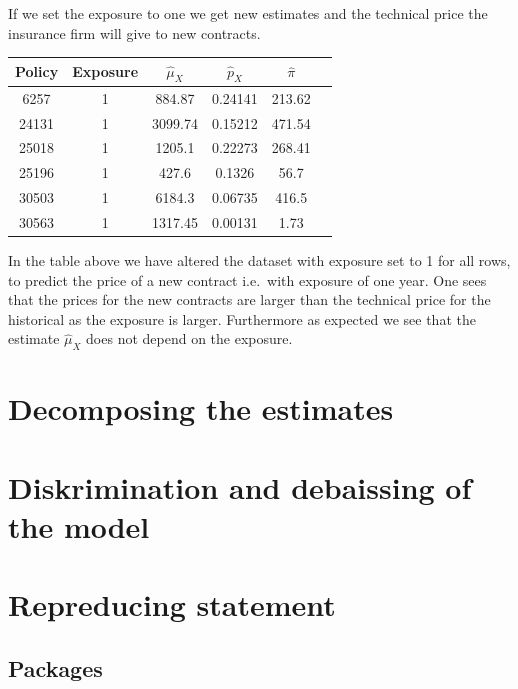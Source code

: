 \documentclass[
]{article}
\begin{document}
If we set the exposure to one we get new estimates and the technical
price the insurance firm will give to new contracts.

\begin{longtable}[]{@{}cccccc@{}}
\toprule()
Policy & Exposure & \(\hat \mu_X\) & \(\hat p_X\) & \(\hat \pi\) & \\
\midrule()
\endhead
6257 & 1 & 884.87 & 0.24141 & 213.62 & \\
24131 & 1 & 3099.74 & 0.15212 & 471.54 & \\
25018 & 1 & 1205.1 & 0.22273 & 268.41 & \\
25196 & 1 & 427.6 & 0.1326 & 56.7 & \\
30503 & 1 & 6184.3 & 0.06735 & 416.5 & \\
30563 & 1 & 1317.45 & 0.00131 & 1.73 & \\
\bottomrule()
\end{longtable}

In the table above we have altered the dataset with exposure set to 1
for all rows, to predict the price of a new contract i.e.~with exposure
of one year. One sees that the prices for the new contracts are larger
than the technical price for the historical as the exposure is larger.
Furthermore as expected we see that the estimate \(\hat \mu_X\) does not
depend on the exposure.

\newpage

\hypertarget{decomposing-the-estimates}{%
\section{Decomposing the estimates}\label{decomposing-the-estimates}}

\hypertarget{diskrimination-and-debaissing-of-the-model}{%
\section{Diskrimination and debaissing of the
model}\label{diskrimination-and-debaissing-of-the-model}}

\hypertarget{repreducing-statement}{%
\section{Repreducing statement}\label{repreducing-statement}}

\hypertarget{packages}{%
\subsection{Packages}\label{packages}}
\end{document}
